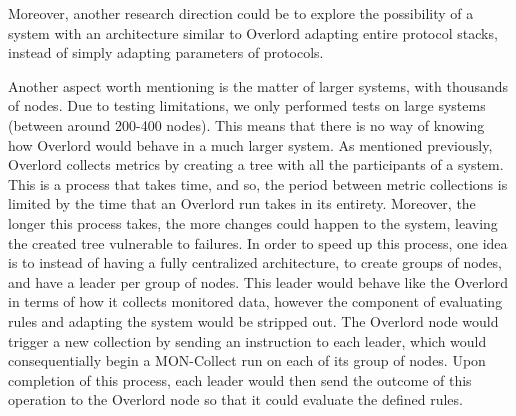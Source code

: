 Moreover, another research direction could be to explore the possibility of a system with an architecture similar to Overlord adapting entire protocol stacks, instead of simply adapting parameters of protocols.

Another aspect worth mentioning is the matter of larger systems, with thousands of nodes. Due to testing limitations, we only performed tests on large systems (between around 200-400 nodes). This means that there is no way of knowing how Overlord would behave in a much larger system. As mentioned previously, Overlord collects metrics by creating a tree with all the participants of a system. This is a process that takes time, and so, the period between metric collections is limited by the time that an Overlord run takes in its entirety. Moreover, the longer this process takes, the more changes could happen to the system, leaving the created tree vulnerable to failures. In order to speed up this process, one idea is to instead of having a fully centralized architecture, to create groups of nodes, and have a leader per group of nodes. This leader would behave like the Overlord in terms of how it collects monitored data, however the component of evaluating rules and adapting the system would be stripped out. The Overlord node would trigger a new collection by sending an instruction to each leader, which would consequentially begin a MON-Collect run on each of its group of nodes. Upon completion of this process, each leader would then send the outcome of this operation to the Overlord node so that it could evaluate the defined rules.